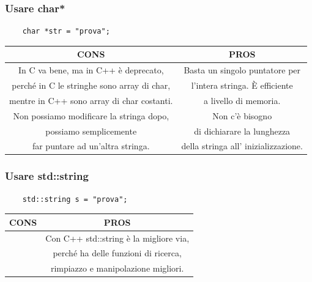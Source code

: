 \subsubsection{Usare char*}

\begin{lstlisting}
	char *str = "prova";
\end{lstlisting}

\begin{tabular}{|c|c|} 
	\hline
	\color{red} CONS & \color{Green} PROS \\
	\hline
	\textsf{\small In C va bene, ma in C++ è deprecato,  } & \textsf{\small Basta un singolo puntatore per  } \\
	\textsf{\small perché in C le stringhe sono array di char,} & \textsf{\small l'intera stringa. È efficiente } \\
	\textsf{\small mentre in C++ sono array di char costanti.} & \textsf{\small a livello di memoria.} \\
	\hline
	\textsf{\small Non possiamo modificare la stringa dopo, } & \textsf{\small Non c'è bisogno  } \\
	\textsf{\small possiamo semplicemente } & \textsf{\small di dichiarare la lunghezza } \\
	\textsf{\small far puntare ad un'altra stringa.} & \textsf{\small della stringa all' inizializzazione.} \\
	\hline
\end{tabular}

\subsubsection{Usare std::string}

\begin{lstlisting}
	std::string s = "prova";
\end{lstlisting}

\begin{tabular}{|c|c|}
	\hline
	\color{red} CONS & \color{Green} PROS \\
	\hline
	\textsf{\small } & \textsf{\small Con C++ std::string è la migliore via,  } \\
	\textsf{\small } & \textsf{\small perché ha delle funzioni di ricerca,} \\
	\textsf{\small } & \textsf{\small rimpiazzo e manipolazione migliori.} \\
	\hline
\end{tabular}

